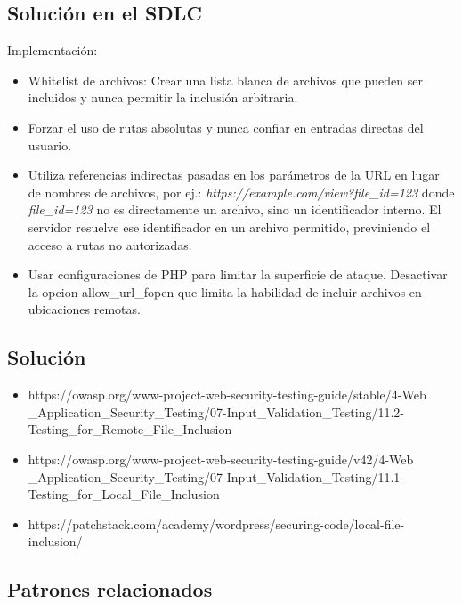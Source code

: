 \subsection{Solución en el SDLC}

Implementación:

\begin{itemize}
    \item Whitelist de archivos: Crear una lista blanca de archivos que pueden ser incluidos y nunca permitir la inclusión arbitraria.
    \item Forzar el uso de rutas absolutas y nunca confiar en entradas directas del usuario.
    \item Utiliza referencias indirectas pasadas en los parámetros de la URL en lugar de nombres de archivos, por ej.: \textit{https://example.com/view?file\_id=123} donde \textit{file\_id=123} no es directamente un archivo, sino un identificador interno. El servidor resuelve ese identificador en un archivo permitido, previniendo el acceso a rutas no autorizadas.
    \item Usar configuraciones de PHP para limitar la superficie de ataque. Desactivar la opcion allow\_url\_fopen que limita la habilidad de incluir archivos en ubicaciones remotas.
\end{itemize}

\subsection{Solución}

\begin{itemize}
    \item https://owasp.org/www-project-web-security-testing-guide/stable/4-Web
    \_Application\_Security\_Testing/07-Input\_Validation\_Testing/11.2-Testing\_for\_Remote\_File\_Inclusion
    \item https://owasp.org/www-project-web-security-testing-guide/v42/4-Web
    \_Application\_Security\_Testing/07-Input\_Validation\_Testing/11.1-Testing\_for\_Local\_File\_Inclusion
    \item https://patchstack.com/academy/wordpress/securing-code/local-file-inclusion/
\end{itemize}

\subsection{Patrones relacionados}

